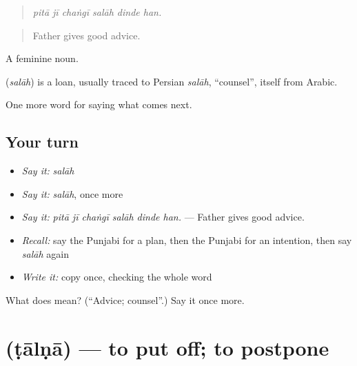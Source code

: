 \begin{quote}
     
\end{quote}

\begin{quote}
\emph{pitā jī chaṅgī salāh dinde han.}
\end{quote}

\begin{quote}
Father gives good advice.
\end{quote}

A feminine noun.

\begin{cousinweb}
\textbf{} (\emph{salāh}) is a loan, usually traced to Persian \emph{salāh}, \textquotedblleft{}counsel\textquotedblright{}, itself from Arabic.
\end{cousinweb}

\begin{grammarlens}[title={What you've built}]
One more word for saying what comes next.
\end{grammarlens}

\subsection*{Your turn}
\begin{itemize}
\raggedright
  \item \emph{Say it:} \emph{salāh}
  \item \emph{Say it:} \emph{salāh}, once more
  \item \emph{Say it:} \emph{pitā jī chaṅgī salāh dinde han.} — Father gives good advice.
  \item \emph{Recall:} say the Punjabi for a plan, then the Punjabi for an intention, then say \emph{salāh} again
  \item \emph{Write it:} copy \textbf{} once, checking the whole word
\end{itemize}

\begin{tcolorbox}[breakable,colback=teal!4,colframe=teal!35!black,title={Before you move on}]
What does  mean? (\textquotedblleft{}Advice; counsel\textquotedblright{}.) Say it once more.
\end{tcolorbox}
\section[\texorpdfstring{\pa{ਟਾਲਣਾ} (ṭālṇā)}{ਟਾਲਣਾ (ṭālṇā)}]{ (ṭālṇā) — to put off; to postpone}

